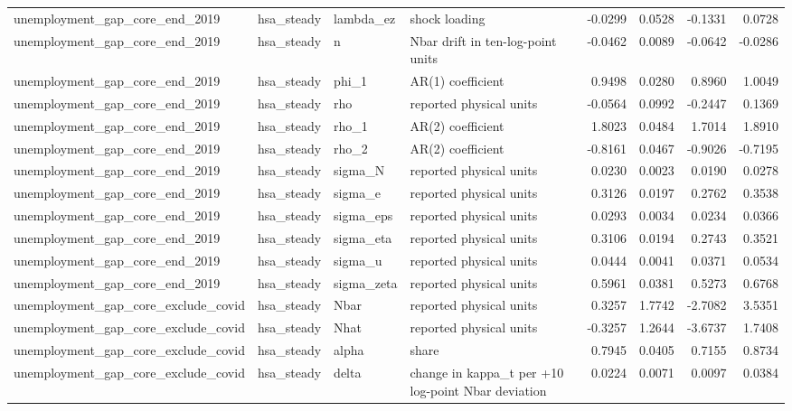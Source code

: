 \begin{tabular}{llllrrrr}
unemployment\_gap\_core\_end\_2019 & hsa\_steady & lambda\_ez & shock loading & -0.0299 & 0.0528 & -0.1331 & 0.0728 \\
unemployment\_gap\_core\_end\_2019 & hsa\_steady & n & Nbar drift in ten-log-point units & -0.0462 & 0.0089 & -0.0642 & -0.0286 \\
unemployment\_gap\_core\_end\_2019 & hsa\_steady & phi\_1 & AR(1) coefficient & 0.9498 & 0.0280 & 0.8960 & 1.0049 \\
unemployment\_gap\_core\_end\_2019 & hsa\_steady & rho & reported physical units & -0.0564 & 0.0992 & -0.2447 & 0.1369 \\
unemployment\_gap\_core\_end\_2019 & hsa\_steady & rho\_1 & AR(2) coefficient & 1.8023 & 0.0484 & 1.7014 & 1.8910 \\
unemployment\_gap\_core\_end\_2019 & hsa\_steady & rho\_2 & AR(2) coefficient & -0.8161 & 0.0467 & -0.9026 & -0.7195 \\
unemployment\_gap\_core\_end\_2019 & hsa\_steady & sigma\_N & reported physical units & 0.0230 & 0.0023 & 0.0190 & 0.0278 \\
unemployment\_gap\_core\_end\_2019 & hsa\_steady & sigma\_e & reported physical units & 0.3126 & 0.0197 & 0.2762 & 0.3538 \\
unemployment\_gap\_core\_end\_2019 & hsa\_steady & sigma\_eps & reported physical units & 0.0293 & 0.0034 & 0.0234 & 0.0366 \\
unemployment\_gap\_core\_end\_2019 & hsa\_steady & sigma\_eta & reported physical units & 0.3106 & 0.0194 & 0.2743 & 0.3521 \\
unemployment\_gap\_core\_end\_2019 & hsa\_steady & sigma\_u & reported physical units & 0.0444 & 0.0041 & 0.0371 & 0.0534 \\
unemployment\_gap\_core\_end\_2019 & hsa\_steady & sigma\_zeta & reported physical units & 0.5961 & 0.0381 & 0.5273 & 0.6768 \\
unemployment\_gap\_core\_exclude\_covid & hsa\_steady & Nbar & reported physical units & 0.3257 & 1.7742 & -2.7082 & 3.5351 \\
unemployment\_gap\_core\_exclude\_covid & hsa\_steady & Nhat & reported physical units & -0.3257 & 1.2644 & -3.6737 & 1.7408 \\
unemployment\_gap\_core\_exclude\_covid & hsa\_steady & alpha & share & 0.7945 & 0.0405 & 0.7155 & 0.8734 \\
unemployment\_gap\_core\_exclude\_covid & hsa\_steady & delta & change in kappa\_t per +10 log-point Nbar deviation & 0.0224 & 0.0071 & 0.0097 & 0.0384 \\

\end{tabular}
